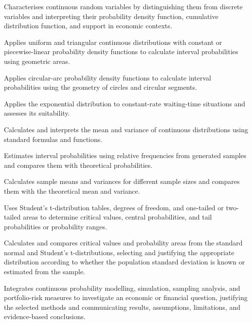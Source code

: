\documentclass[10pt,letterpaper]{article}
\newcommand{\criterion}[2]{\item[\textbf{C#1.}] #2}
\newcommand{\plansubsection}[1]{\Needspace{7\baselineskip}\par\vspace{5pt}{\normalsize\bfseries #1\par}\vspace{1pt}}
\begin{document}
	\plansubsection{Assessment Criteria}
	\begin{description}[leftmargin=3.1em,labelwidth=2.7em,labelsep=0.4em,itemsep=2pt,topsep=2pt]
		\criterion{1}{Characterises continuous random variables by distinguishing them from discrete variables and interpreting their probability density function, cumulative distribution function, and support in economic contexts.}
		\criterion{2}{Applies uniform and triangular continuous distributions with constant or piecewise-linear probability density functions to calculate interval probabilities using geometric areas.}
		\criterion{3}{Applies circular-arc probability density functions to calculate interval probabilities using the geometry of circles and circular segments.}
		\criterion{4}{Applies the exponential distribution to constant-rate waiting-time situations and assesses its suitability.}
		\criterion{5}{Calculates and interprets the mean and variance of continuous distributions using standard formulas and functions.}
		\criterion{6}{Estimates interval probabilities using relative frequencies from generated samples and compares them with theoretical probabilities.}
		\criterion{7}{Calculates sample means and variances for different sample sizes and compares them with the theoretical mean and variance.}
		\criterion{8}{Uses Student's t-distribution tables, degrees of freedom, and one-tailed or two-tailed areas to determine critical values, central probabilities, and tail probabilities or probability ranges.}
		\criterion{9}{Calculates and compares critical values and probability areas from the standard normal and Student's t-distributions, selecting and justifying the appropriate distribution according to whether the population standard deviation is known or estimated from the sample.}
		\criterion{10}{Integrates continuous probability modelling, simulation, sampling analysis, and portfolio-risk measures to investigate an economic or financial question, justifying the selected methods and communicating results, assumptions, limitations, and evidence-based conclusions.}
	\end{description}
	
\end{document}
